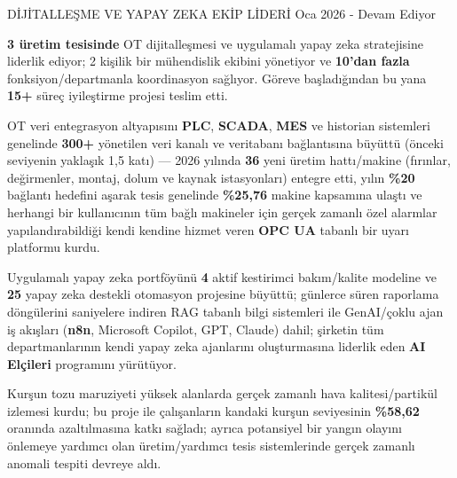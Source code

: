 
\vspace{-3mm}

\begin{cventries}

  \cventry
    {DİJİTALLEŞME VE YAPAY ZEKA EKİP LİDERİ} %
    {} %
    {} %
    {Oca 2026 - Devam Ediyor} %
    {
      \begin{cvitems} %
        \item {\textbf{3 üretim tesisinde} OT dijitalleşmesi ve uygulamalı yapay zeka stratejisine liderlik ediyor; 2 kişilik bir mühendislik ekibini yönetiyor ve \textbf{10'dan fazla} fonksiyon/departmanla koordinasyon sağlıyor. Göreve başladığından bu yana \textbf{15+} süreç iyileştirme projesi teslim etti.}
        \item {OT veri entegrasyon altyapısını \textbf{PLC}, \textbf{SCADA}, \textbf{MES} ve historian sistemleri genelinde \textbf{300+} yönetilen veri kanalı ve veritabanı bağlantısına büyüttü (önceki seviyenin yaklaşık 1,5 katı) --- 2026 yılında \textbf{36} yeni üretim hattı/makine (fırınlar, değirmenler, montaj, dolum ve kaynak istasyonları) entegre etti, yılın \textbf{\%20} bağlantı hedefini aşarak tesis genelinde \textbf{\%25,76} makine kapsamına ulaştı ve herhangi bir kullanıcının tüm bağlı makineler için gerçek zamanlı özel alarmlar yapılandırabildiği kendi kendine hizmet veren \textbf{OPC UA} tabanlı bir uyarı platformu kurdu.}
        \item {Uygulamalı yapay zeka portföyünü \textbf{4} aktif kestirimci bakım/kalite modeline ve \textbf{25} yapay zeka destekli otomasyon projesine büyüttü; günlerce süren raporlama döngülerini saniyelere indiren RAG tabanlı bilgi sistemleri ile GenAI/çoklu ajan iş akışları (\textbf{n8n}, Microsoft Copilot, GPT, Claude) dahil; şirketin tüm departmanlarının kendi yapay zeka ajanlarını oluşturmasına liderlik eden \textbf{AI Elçileri} programını yürütüyor.}
        \item {Kurşun tozu maruziyeti yüksek alanlarda gerçek zamanlı hava kalitesi/partikül izlemesi kurdu; bu proje ile çalışanların kandaki kurşun seviyesinin \textbf{\%58,62} oranında azaltılmasına katkı sağladı; ayrıca potansiyel bir yangın olayını önlemeye yardımcı olan üretim/yardımcı tesis sistemlerinde gerçek zamanlı anomali tespiti devreye aldı.}

\end{cvitems}}
\end{cventries}
